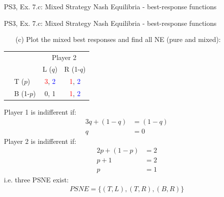 \begin{frame}{PS3, Ex. 7.c: Mixed Strategy Nash Equilibria - best-response functions}
\begin{multicols}{2}
  \vfill\null
  \end{multicols}
\end{frame}
\begin{frame}{PS3, Ex. 7.c: Mixed Strategy Nash Equilibria - best-response functions}
  \begin{multicols}{2}
    \begin{itemize}
      \item[(c)] Plot the mixed best responses and find all NE (pure and mixed):
    \end{itemize}
    \begin{table}
      \begin{tabular}{cl|c|c|}
        & \multicolumn{1}{c}{} & \multicolumn{2}{c}{\color{blue}Player 2}\\
        \parbox[t]{1mm}{}
        &  &  &  \\
        & T  ($p$)  & \textcolor{red}{3}, \textcolor{blue}{2} & \textcolor{red}{1}, \textcolor{blue}{2} \\
        & B  (1-$p$)& 0, 1 & \textcolor{red}{1}, \textcolor{blue}{2} \\
      \end{tabular}
    \end{table}
    Player 1 is indifferent if:
    \begin{align*}
      3q+(1-q) &= (1-q) \\
      q &= 0
    \end{align*}
    Player 2 is indifferent if:
    \begin{align*}
      2p + (1-p) &= 2 \\
      p + 1      &= 2 \\
      p          &= 1
    \end{align*}
    i.e. three PSNE exist:
    \begin{align*}
      PSNE=\{(T,L),(T,R),(B,R)\}
    \end{align*}
  \vfill\null \columnbreak

\end{multicols}
\end{frame}
